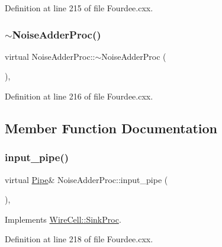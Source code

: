 Definition at line 215 of file Fourdee.\+cxx.

\mbox{\label{class_noise_adder_proc_a70b81e0f690311b3e4a980af18d87586}} 
\subsubsection{\texorpdfstring{$\sim$\+Noise\+Adder\+Proc()}{~NoiseAdderProc()}}
{\footnotesize\ttfamily virtual Noise\+Adder\+Proc\+::$\sim$\+Noise\+Adder\+Proc (\begin{DoxyParamCaption}{ }\end{DoxyParamCaption})\hspace{0.3cm}{\ttfamily [inline]}, {\ttfamily [virtual]}}



Definition at line 216 of file Fourdee.\+cxx.



\subsection{Member Function Documentation}
\mbox{\label{class_noise_adder_proc_ae665a985d66a87bc63aeefb3333170d2}} 
\subsubsection{\texorpdfstring{input\+\_\+pipe()}{input\_pipe()}}
{\footnotesize\ttfamily virtual \hyperlink{namespace_wire_cell_afce9bb01c731347c3d4c8ca9d4ed804f}{Pipe}\& Noise\+Adder\+Proc\+::input\+\_\+pipe (\begin{DoxyParamCaption}{ }\end{DoxyParamCaption})\hspace{0.3cm}{\ttfamily [inline]}, {\ttfamily [virtual]}}



Implements \hyperlink{class_wire_cell_1_1_sink_proc_a47ec8c790457ad63e9d0bb9b1b7da935}{Wire\+Cell\+::\+Sink\+Proc}.



Definition at line 218 of file Fourdee.\+cxx.

